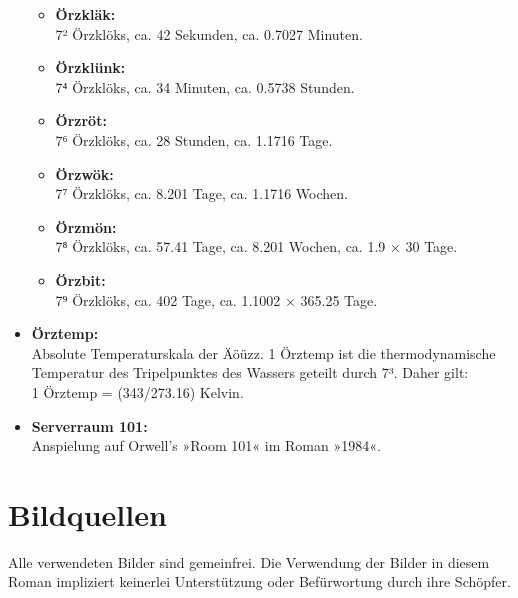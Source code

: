 \begin{itemize}
    \begin{itemize}
        \item \textbf{Örzkläk:}\\ 7² Örzklöks, ca. 42 Sekunden, ca. 0.7027 Minuten.
        \item \textbf{Örzklünk:}\\ 7⁴ Örzklöks, ca. 34 Minuten, ca. 0.5738 Stunden.
        \item \textbf{Örzröt:}\\ 7⁶ Örzklöks, ca. 28 Stunden, ca. 1.1716 Tage.
        \item \textbf{Örzwök:}\\ 7⁷ Örzklöks, ca. 8.201 Tage, ca. 1.1716 Wochen.
        \item \textbf{Örzmön:}\\ 7⁸ Örzklöks, ca. 57.41 Tage, ca. 8.201 Wochen, ca. 1.9 × 30 Tage.
        \item \textbf{Örzbit:}\\ 7⁹ Örzklöks, ca. 402 Tage, ca. 1.1002 × 365.25 Tage.
    \end{itemize}
    \item \textbf{Örztemp:}\\ Absolute Temperaturskala der Äöüzz. 1 Örztemp ist die thermodynamische Temperatur des Tripelpunktes des Wassers geteilt durch 7³. Daher gilt:\\ 1 Örztemp = (343/273.16) Kelvin.
    \item \textbf{Serverraum 101:}\\ Anspielung auf Orwell’s »Room 101« im Roman »1984«.
\end{itemize}


\chapter{Bildquellen}

Alle verwendeten Bilder sind gemeinfrei. Die Verwendung der Bilder in diesem Roman impliziert keinerlei Unterstützung oder Befürwortung durch ihre Schöpfer.

